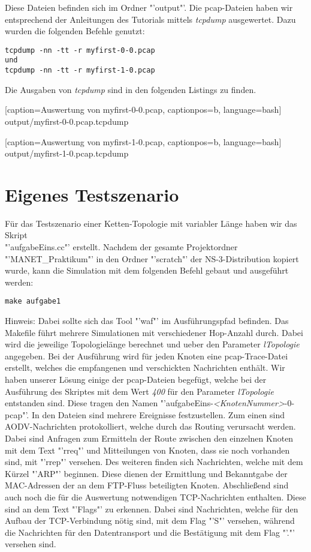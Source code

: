 \documentclass[12pt,a4paper,titlepage]{article}
\begin{document}
Diese Dateien befinden sich im Ordner "'output"'. Die pcap-Dateien haben wir entsprechend der Anleitungen des Tutorials mittels \textit{tcpdump} ausgewertet. Dazu wurden die folgenden Befehle genutzt:

\begin{lstlisting}
tcpdump -nn -tt -r myfirst-0-0.pcap
und
tcpdump -nn -tt -r myfirst-1-0.pcap
\end{lstlisting}

Die Ausgaben von \textit{tcpdump} sind in den folgenden Listings zu finden.


	[caption={Auswertung von myfirst-0-0.pcap}\label{lst:myfirst_1_pcap},
		captionpos=b,
		language=bash] %
	{output/myfirst-0-0.pcap.tcpdump}


	[caption={Auswertung von myfirst-1-0.pcap}\label{lst:myfirst_2_pcap},
		captionpos=b,
		language=bash] %
	{output/myfirst-1-0.pcap.tcpdump}

\section{Eigenes Testszenario}

Für das Testszenario einer Ketten-Topologie mit variabler Länge haben wir das Skript\\ "'aufgabeEins.cc"' erstellt. Nachdem der gesamte Projektordner "'MANET\_Praktikum"' in den Ordner "'scratch"' der NS-3-Distribution kopiert wurde, kann die Simulation mit dem folgenden Befehl gebaut und ausgeführt werden:

\begin{lstlisting}
make aufgabe1
\end{lstlisting}

Hinweis: Dabei sollte sich das Tool "'waf"' im Ausführungspfad befinden. Das Makefile führt mehrere Simulationen mit verschiedener Hop-Anzahl durch. Dabei wird die jeweilige Topologielänge berechnet und ueber den Parameter \textit{lTopologie} angegeben. Bei der Ausführung wird für jeden Knoten eine pcap-Trace-Datei erstellt, welches die empfangenen und verschickten Nachrichten enthält. Wir haben unserer Lösung einige der pcap-Dateien begefügt, welche bei der Ausführung des Skriptes mit dem Wert \textit{400} für den Parameter \textit{lTopologie} entstanden sind. Diese tragen den Namen "'aufgabeEins-\textit{\textless KnotenNummer\textgreater}-0-pcap"'. 
In den Dateien sind mehrere Ereignisse festzustellen. Zum einen sind AODV-Nachrichten protokolliert, welche durch das Routing verursacht werden. Dabei sind Anfragen zum Ermitteln der Route zwischen den einzelnen Knoten mit dem Text "'rreq"'  und Mitteilungen von Knoten, dass sie noch vorhanden sind, mit "'rrep"' versehen. 
Des weiteren finden sich Nachrichten, welche mit dem Kürzel "'ARP"' beginnen. Diese dienen der Ermittlung und Bekanntgabe der MAC-Adressen der an dem FTP-Fluss beteiligten Knoten. Abschließend sind auch noch die für die Auswertung notwendigen TCP-Nachrichten enthalten. Diese sind an dem Text "'Flags"' zu erkennen. Dabei sind Nachrichten, welche für den Aufbau der TCP-Verbindung nötig sind, mit dem Flag "'S"' versehen, während die Nachrichten für den Datentransport und die Bestätigung mit dem Flag "'."' versehen sind.
\end{document}
